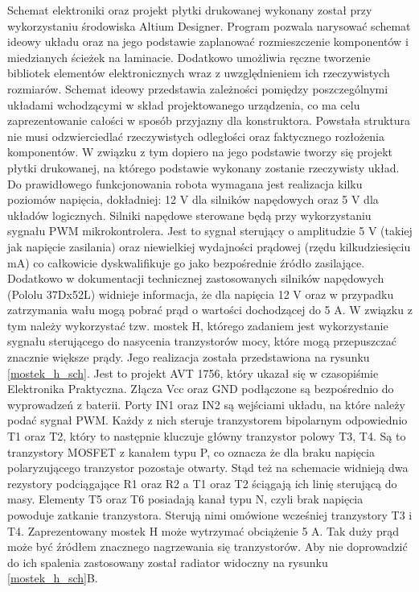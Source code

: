 Schemat elektroniki oraz projekt płytki drukowanej wykonany został przy wykorzystaniu środowiska Altium Designer. Program pozwala narysować schemat ideowy układu oraz na jego podstawie zaplanować rozmieszczenie komponentów i miedzianych ścieżek na laminacie. Dodatkowo umożliwia ręczne tworzenie bibliotek elementów elektronicznych wraz z uwzględnieniem ich rzeczywistych rozmiarów. Schemat ideowy przedstawia zależności pomiędzy poszczególnymi układami wchodzącymi w skład projektowanego urządzenia, co ma celu zaprezentowanie całości w sposób przyjazny dla konstruktora. Powstała struktura nie musi odzwierciedlać rzeczywistych odległości oraz faktycznego rozłożenia komponentów. W związku z tym dopiero na jego podstawie tworzy się projekt płytki drukowanej, na którego podstawie wykonany zostanie rzeczywisty układ.
Do prawidłowego funkcjonowania robota wymagana jest realizacja kilku poziomów napięcia, dokładniej: 12 V dla silników napędowych oraz 5 V dla układów logicznych. Silniki napędowe sterowane będą przy wykorzystaniu sygnału PWM mikrokontrolera. Jest to sygnał sterujący o amplitudzie 5 V (takiej jak napięcie zasilania) oraz  niewielkiej wydajności prądowej (rzędu kilkudziesięciu mA) co całkowicie dyskwalifikuje go jako bezpośrednie źródło zasilające. Dodatkowo w dokumentacji technicznej zastosowanych silników napędowych (Pololu 37Dx52L) widnieje informacja, że dla napięcia 12 V oraz w przypadku zatrzymania wału mogą pobrać prąd o wartości dochodzącej do 5 A. W związku z tym należy wykorzystać tzw. mostek H, którego zadaniem jest wykorzystanie sygnału sterującego do nasycenia tranzystorów mocy, które mogą przepuszczać znacznie większe prądy. Jego realizacja została przedstawiona na rysunku \ref{mostek_h_sch}. Jest to projekt AVT 1756, który ukazał się w czasopiśmie Elektronika Praktyczna. Złącza Vcc oraz GND podłączone są bezpośrednio do wyprowadzeń z baterii. Porty IN1 oraz IN2 są wejściami układu, na które należy podać sygnał PWM. Każdy z nich steruje tranzystorem bipolarnym odpowiednio T1 oraz T2, który to następnie kluczuje główny tranzystor polowy T3, T4. Są to tranzystory MOSFET z kanałem typu P, co oznacza że dla braku napięcia polaryzującego tranzystor pozostaje otwarty. Stąd też na schemacie widnieją dwa rezystory podciągające R1 oraz R2 a T1 oraz T2 ściągają ich linię sterującą do masy. Elementy T5 oraz T6 posiadają kanał typu N, czyli brak napięcia powoduje zatkanie tranzystora. Sterują nimi omówione wcześniej tranzystory T3 i T4. Zaprezentowany mostek H może wytrzymać obciążenie 5 A. Tak duży prąd może być źródłem znacznego nagrzewania się tranzystorów. Aby nie doprowadzić do ich spalenia zastosowany został radiator widoczny na rysunku \ref{mostek_h_sch}B.
